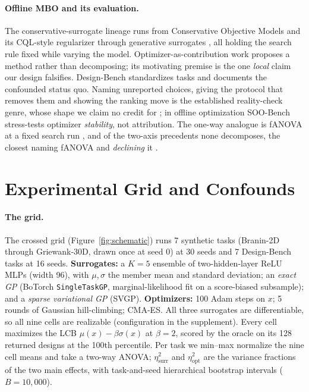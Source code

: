 \documentclass[letterpaper]{article} %
\theoremstyle{plain}
\newcommand{\mdemph}[1]{\emph{#1}}
\begin{document}
\paragraph{Offline MBO and its evaluation.} The conservative-surrogate lineage runs from Conservative Objective Models \citep{trabucco2021coms} and its CQL-style regularizer \citep{kumar2020cql} through generative surrogates \citep{brookes2019cbas,krishnamoorthy2023ddom}, all holding the search rule fixed while varying the model. Optimizer-as-contribution work \citep{chemingui2024pggs} proposes a method rather than decomposing; its motivating premise is the one \mdemph{local} claim our design falsifies. Design-Bench \citep{trabucco2022designbench} standardizes tasks and documents the confounded status quo. Naming unreported choices, giving the protocol that removes them and showing the ranking move is the established reality-check genre, whose shape we claim no credit for \citep{henderson2018matters,agarwal2021precipice,balduzzi2018reevaluating,ferraridacrema2019worrying,musgrave2020realitycheck,lucic2018gansequal}; in offline optimization SOO-Bench \citep{qian2025soobench} stress-tests optimizer \mdemph{stability}, not attribution. The one-way analogue is fANOVA at a fixed search run \citep{hutter2014fanova}, and of the two-axis precedents none decomposes, the closest naming fANOVA and \mdemph{declining} it \citep{liang2021benchmarking,moosbauer2022benchmarkdriven}.

\section{Experimental Grid and Confounds}
\label{sec:confounds}

\paragraph{The grid.} The crossed grid (Figure~\ref{fig:schematic}) runs 7 synthetic tasks (Branin-2D through Griewank-30D, drawn once at seed 0) at 30 seeds and 7 Design-Bench tasks at 16 seeds. \textbf{Surrogates:} a $K{=}5$ ensemble of two-hidden-layer ReLU MLPs (width 96), with $\mu,\sigma$ the member mean and standard deviation; an \mdemph{exact GP} (BoTorch \texttt{SingleTaskGP}, marginal-likelihood fit on a score-biased subsample); and a \mdemph{sparse variational GP} (SVGP). \textbf{Optimizers:} 100 Adam steps on $x$; 5 rounds of Gaussian hill-climbing; CMA-ES. All three surrogates are differentiable, so all nine cells are realizable (configuration in the supplement). Every cell maximizes the LCB $\mu(x)-\beta\sigma(x)$ at $\beta{=}2$, scored by the oracle on its 128 returned designs at the 100th percentile. Per task we min--max normalize the nine cell means and take a two-way ANOVA; $\eta^2_{\text{surr}}$ and $\eta^2_{\text{opt}}$ are the variance fractions of the two main effects, with task-and-seed hierarchical bootstrap intervals ($B{=}10{,}000$).
\end{document}
